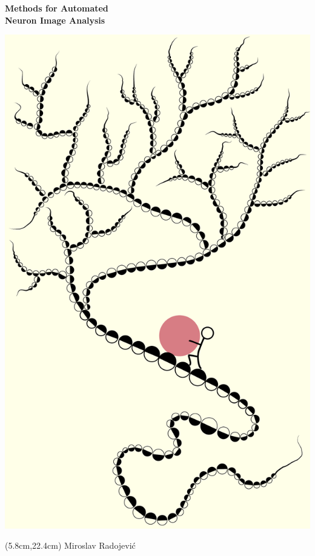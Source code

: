 %
%
\setlength{\parindent}{0pt}
\thispagestyle{empty}

\afterpage{\restorepagecolor} %

\vspace*{-2cm}
\begin{changemargin}{-0.5cm}{-0.5cm}

\begin{center}
	{\Huge\bf Methods for Automated \\[1ex] Neuron Image Analysis \\[2.2ex]}
\end{center}

\begin{center}
	\includegraphics[height=1.15\linewidth]{syziphus}
\end{center}

\begin{textblock*}{\textwidth}(5.8cm,22.4cm)
	{\Huge Miroslav Radojevi\'{c}}
\end{textblock*}

\end{changemargin}

